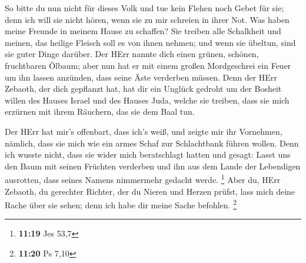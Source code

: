  So bitte du nun nicht für dieses Volk und tue kein Flehen
noch Gebet für sie; denn ich will sie nicht hören, wenn sie zu mir
schreien in ihrer Not.  Was haben meine Freunde in meinem
Hause zu schaffen? Sie treiben alle Schalkheit und meinen, das heilige
Fleisch soll es von ihnen nehmen; und wenn sie übeltun, sind sie guter
Dinge darüber.  Der HErr nannte dich einen grünen, schönen,
fruchtbaren Ölbaum; aber nun hat er mit einem großen Mordgeschrei ein
Feuer um ihn lassen anzünden, dass seine Äste verderben müssen.
 Denn der HErr Zebaoth, der dich gepflanzt hat, hat dir ein
Unglück gedroht um der Bosheit willen des Hauses Israel und des Hauses
Juda, welche sie treiben, dass sie mich erzürnen mit ihrem Räuchern, das
sie dem Baal tun.

 Der HErr hat mir's offenbart, dass ich's weiß, und zeigte
mir ihr Vornehmen,  nämlich, dass sie mich wie ein armes
Schaf zur Schlachtbank führen wollen. Denn ich wusste nicht, dass sie
wider mich beratschlagt hatten und gesagt: Lasst uns den Baum mit seinen
Früchten verderben und ihn aus dem Lande der Lebendigen ausrotten, dass
seines Namens nimmermehr gedacht werde. \footnote{\textbf{11:19} Jes
  53,7}  Aber du, HErr Zebaoth, du gerechter Richter, der
du Nieren und Herzen prüfst, lass mich deine Rache über sie sehen; denn
ich habe dir meine Sache befohlen. \footnote{\textbf{11:20} Ps 7,10}

